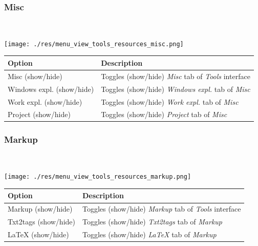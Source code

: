 \newpage
\hypertarget{menu_view_tools_resources_misc}{}
\subsubsection{Misc}\\

\texttt{[image: ./res/menu\_view\_tools\_resources\_misc.png]}\\

\begin{scriptsize}\begin{tabularx}{\textwidth}{>{\hsize=0.5\hsize}X>{\hsize=0.7\hsize}X}\\
    \hline
    \textbf{Option} & \textbf{Description} \\
    \hline
    Misc (show/hide) & Toggles (show/hide) \textit{Misc} tab of \textit{Tools} interface \\
    Windows expl. (show/hide) & Toggles (show/hide) \textit{Windows expl.} tab of \textit{Misc} \\
    Work expl. (show/hide) & Toggles (show/hide) \textit{Work expl.} tab of \textit{Misc} \\
    Project (show/hide) & Toggles (show/hide) \textit{Project} tab of \textit{Misc} \\
    \hline
  \end{tabularx}\end{scriptsize}


\hypertarget{menu_view_tools_resources_markup}{}
\subsubsection{Markup}\\

\texttt{[image: ./res/menu\_view\_tools\_resources\_markup.png]}\\

\begin{scriptsize}\begin{tabularx}{\textwidth}{>{\hsize=0.3\hsize}X>{\hsize=0.7\hsize}X}\\
    \hline
    \textbf{Option} & \textbf{Description} \\
    \hline
    Markup (show/hide) & Toggles (show/hide) \textit{Markup} tab of \textit{Tools} interface \\
    Txt2tags (show/hide) & Toggles (show/hide) \textit{Txt2tags} tab of \textit{Markup} \\
    LaTeX (show/hide) & Toggles (show/hide) \textit{LaTeX} tab of \textit{Markup} \\
    \hline
  \end{tabularx}\end{scriptsize}


